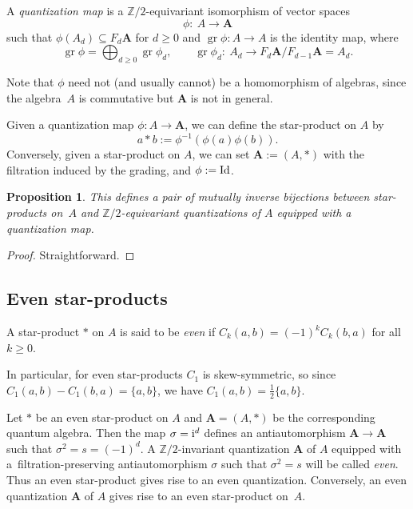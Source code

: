 \documentclass[pdftex]{sigma}
\numberwithin{equation}{section}
\newtheorem{Proposition}[Theorem]{Proposition}
\begin{document}
\begin{Definition}A \emph{quantization map} is a ${\mathbb Z}/2$-equivariant isomorphism of vector spaces
\[
\phi \colon \ A \to {{\mathbf A}}
\]
such that $\phi(A_d) \subseteq F_d{{\mathbf A}}$ for $d\ge 0$ and $\operatorname{gr} \phi \colon A \to A$ is the identity map, where
\[
\operatorname{gr} \phi = \bigoplus_{d\geq 0} \operatorname{gr} \phi_d, \qquad \operatorname{gr} \phi_d \colon \ A_d \to F_d{{\mathbf A}}/F_{d-1}{{\mathbf A}}=A_d.
\]
\end{Definition}
Note that $\phi$ need not (and usually cannot) be a homomorphism of algebras, since the algebra~$A$ is commutative but ${{\mathbf A}}$ is not in general.

Given a quantization map $\phi\colon A \to {{\mathbf A}}$, we can define the star-product on $A$ by
\[
a * b := \phi^{-1}(\phi(a)\phi(b)).
\]
Conversely, given a star-product on $A$, we can set ${{\mathbf A}}:=(A,*)$ with the filtration induced by the grading, and $\phi:={\rm Id}$.

\begin{Proposition} This defines a pair of mutually inverse bijections between star-products on~$A$ and ${\mathbb Z}/2$-equivariant quantizations of $A$ equipped with a quantization map.
\end{Proposition}

\begin{proof} Straightforward.
\end{proof}

\subsection{Even star-products}

\begin{Definition} A star-product $*$ on $A$ is said to be {\it even} if $C_k(a,b)=(-1)^k C_k(b,a)$ for all $k\ge 0$.
\end{Definition}

In particular, for even star-products $C_1$ is skew-symmetric, so since $C_1(a,b)-C_1(b,a)=\lbrace a,b\rbrace$, we have $C_1(a,b)=\frac{1}{2}\lbrace a,b\rbrace$.

Let $*$ be an even star-product on $A$ and ${{\mathbf A}}=(A,*)$ be the corresponding quantum algebra.
Then the map $\sigma={\rm i}^d$ defines an antiautomorphism ${{\mathbf A}}\to {{\mathbf A}}$ such that $\sigma^2=s=(-1)^d$. A ${\mathbb Z}/2$-invariant quantization ${\mathbf A}$ of $A$ equipped with a~filtration-preserving antiautomorphism $\sigma$ such that $\sigma^2=s$ will be called {\it even}. Thus an even star-product gives rise to an even quantization. Conversely, an even quantization ${{\mathbf A}}$ of $A$ gives rise to an even star-product on~$A$.
\end{document}
